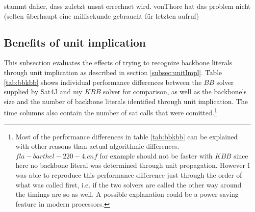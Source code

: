 stammt daher, dass zuletzt unsat errechnet wird. vonThore hat das problem nicht (selten überhaupt eine millisekunde gebraucht für letzten aufruf)

\subsection{Benefits of unit implication}
\label{ss:result_unit}
This subsection evaluates the effects of trying to recognize backbone literals through unit implication as described in section \ref{subsec:unitImpl}. Table \ref{tab:bbkbb} shows individual performance differences between the $BB$ solver supplied by Sat4J and my $KBB$ solver for comparison, as well as the backbone's size and the number of backbone literals identified through unit implication. The time columns also contain the number of sat calls that were comitted.\footnote{Most of the performance differences in table \ref{tab:bbkbb} can be explained with other reasons than actual algorithmic differences. $fla-barthel-220-4.cnf$ for example should not be faster with $KBB$ since here no backbone literal was determined through unit propagation. However I was able to reproduce this performance difference just through the order of what was called first, i.e. if the two solvers are called the other way around the timings are so as well. A possible explanation could be a power saving feature in modern processors.}

